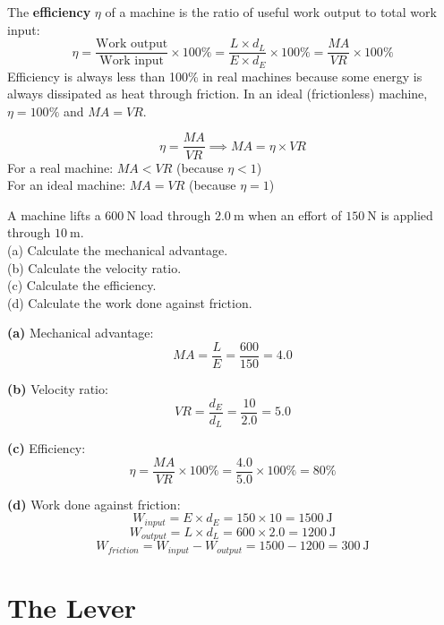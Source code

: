 \begin{definitionbox}[Efficiency]
The \textbf{efficiency} $\eta$ of a machine is the
ratio of useful work output to total work input:
\[
  \eta = \frac{\text{Work output}}{\text{Work input}}
  \times 100\%
  = \frac{L \times d_L}{E \times d_E} \times 100\%
  = \frac{MA}{VR} \times 100\%
\]
Efficiency is always less than 100\% in real machines
because some energy is always dissipated as heat
through friction. In an ideal (frictionless) machine,
$\eta = 100\%$ and $MA = VR$.
\end{definitionbox}

\begin{keybox}
\[
  \eta = \frac{MA}{VR} \implies MA = \eta \times VR
\]
For a real machine: $MA < VR$ (because $\eta < 1$)\\
For an ideal machine: $MA = VR$ (because $\eta = 1$)
\end{keybox}

\begin{examplebox}[10.1]
A machine lifts a $600\ \text{N}$ load through
$2.0\ \text{m}$ when an effort of $150\ \text{N}$ is
applied through $10\ \text{m}$.\\
(a) Calculate the mechanical advantage.\\
(b) Calculate the velocity ratio.\\
(c) Calculate the efficiency.\\
(d) Calculate the work done against friction.
\end{examplebox}

\begin{solutionbox}
\textbf{(a)} Mechanical advantage:
\[
  MA = \frac{L}{E} = \frac{600}{150} = 4.0
\]

\textbf{(b)} Velocity ratio:
\[
  VR = \frac{d_E}{d_L} = \frac{10}{2.0} = 5.0
\]

\textbf{(c)} Efficiency:
\[
  \eta = \frac{MA}{VR} \times 100\%
  = \frac{4.0}{5.0} \times 100\% = 80\%
\]

\textbf{(d)} Work done against friction:
\[
  W_{input} = E \times d_E = 150 \times 10 = 1500\ \text{J}
\]
\[
  W_{output} = L \times d_L = 600 \times 2.0 = 1200\ \text{J}
\]
\[
  W_{friction} = W_{input} - W_{output} = 1500 - 1200
  = 300\ \text{J}
\]
\end{solutionbox}

\section{The Lever}

